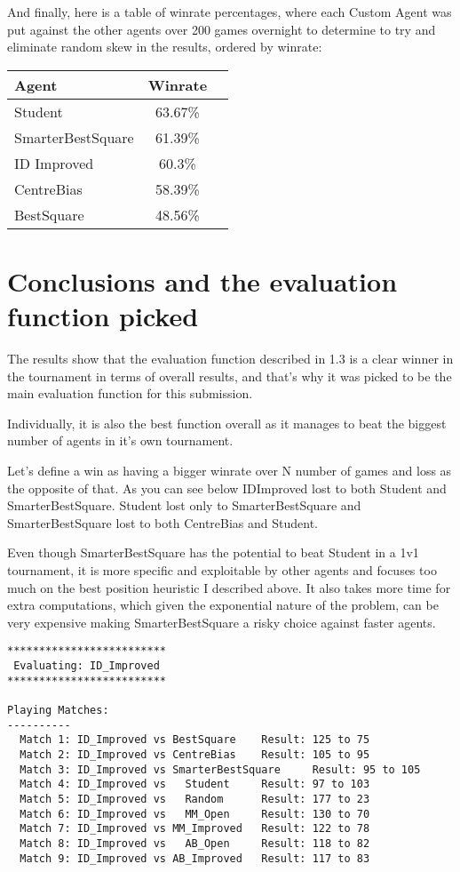 \documentclass{article}
\begin{document}
And finally, here is a table of winrate percentages, where each Custom Agent was put against the other agents over 200 games overnight to determine to try and eliminate random skew in the results, ordered by winrate:
\vspace{5mm}

\begin{tabular}{ l | c  r }
  Agent & Winrate \\ \hline
  Student & 63.67\% \\
  SmarterBestSquare & 61.39\% \\
  ID Improved & 60.3\% \\
  CentreBias & 58.39\% \\
  BestSquare & 48.56\% \\ 
\end{tabular}

\section{Conclusions and the evaluation function picked}
The results show that the evaluation function described in 1.3 is a clear winner in the tournament in terms of overall results, and that's why it was picked to be the main evaluation function for this submission.

Individually, it is also the best function overall as it manages to beat the biggest number of agents in it's own tournament.

Let's define a win as having a bigger winrate over N number of games and loss as the opposite of that. As you can see below IDImproved lost to both Student and SmarterBestSquare. Student lost only to SmarterBestSquare and SmarterBestSquare lost to both CentreBias and Student.

Even though SmarterBestSquare has the potential to beat Student in a 1v1 tournament, it is more specific and exploitable by other agents and focuses too much on the best position heuristic I described above. It also takes more time for extra computations, which given the exponential nature of the problem, can be very expensive making SmarterBestSquare a risky choice against faster agents.

\vspace{15mm}

\begin{lstlisting}
*************************
 Evaluating: ID_Improved 
*************************

Playing Matches:
----------
  Match 1: ID_Improved vs BestSquare  	Result: 125 to 75
  Match 2: ID_Improved vs CentreBias  	Result: 105 to 95
  Match 3: ID_Improved vs SmarterBestSquare 	Result: 95 to 105
  Match 4: ID_Improved vs   Student   	Result: 97 to 103
  Match 5: ID_Improved vs   Random    	Result: 177 to 23
  Match 6: ID_Improved vs   MM_Open   	Result: 130 to 70
  Match 7: ID_Improved vs MM_Improved 	Result: 122 to 78
  Match 8: ID_Improved vs   AB_Open   	Result: 118 to 82
  Match 9: ID_Improved vs AB_Improved 	Result: 117 to 83
\end{lstlisting}
\end{document}

